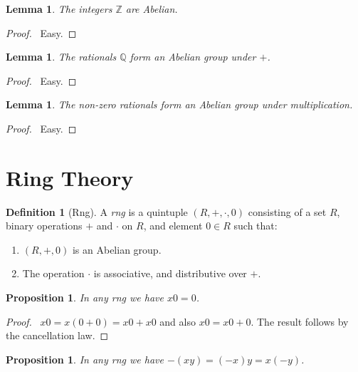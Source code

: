 \documentclass{article}
\let\qed\relax
\newtheorem{lemma}[axiom]{Lemma}
\newtheorem{proposition}[axiom]{Proposition}
\theoremstyle{definition}
\newtheorem{definition}[axiom]{Definition}
\begin{document}
    \begin{lemma}
        The integers $\mathbb{Z}$ are Abelian.
    \end{lemma}

    \begin{proof}
        \pf\ Easy. \qed
    \end{proof}

    \begin{lemma}
        The rationals $\mathbb{Q}$ form an Abelian group under $+$.
    \end{lemma}

    \begin{proof}
        \pf\ Easy.
    \end{proof}

    \begin{lemma}
        The non-zero rationals form an Abelian group under multiplication.
    \end{lemma}

    \begin{proof}
        \pf\ Easy. \qed
    \end{proof}

    \section{Ring Theory}

    \begin{definition}[Rng]
        A \emph{rng} is a quintuple $(R, +, \cdot, 0)$ consisting of a set $R$,
        binary operations $+$ and $\cdot$ on $R$, and element $0 \in R$ such that:
        \begin{enumerate}
            \item $(R, +, 0)$ is an Abelian group.
            \item The operation $\cdot$ is associative, and distributive over $+$.
        \end{enumerate}
    \end{definition}

    \begin{proposition}
        In any rng we have $x0 = 0$.
    \end{proposition}

    \begin{proof}
        \pf\ $x0 = x(0+0) = x0+x0$ and also $x0 = x0+0$. The result follows by the cancellation law. \qed
    \end{proof}

    \begin{proposition}
        In any rng we have $-(xy) = (-x)y = x(-y)$.
    \end{proposition}
\end{document}
